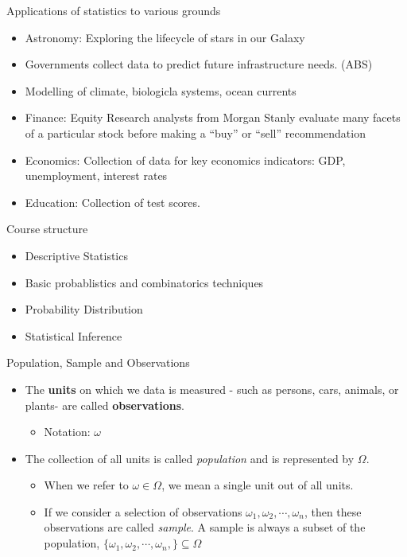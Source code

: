 \documentclass[ignorenonframetext,]{beamer}
\providecommand{\tightlist}{%
  \setlength{\itemsep}{0pt}\setlength{\parskip}{0pt}}
\begin{document}
\begin{frame}{Applications of statistics to various grounds}

\begin{itemize}
\item
  Astronomy: Exploring the lifecycle of stars in our Galaxy
\item
  Governments collect data to predict future infrastructure needs. (ABS)
\item
  Modelling of climate, biologicla systems, ocean currents
\item
  Finance: Equity Research analysts from Morgan Stanly evaluate many
  facets of a particular stock before making a ``buy'' or ``sell''
  recommendation
\item
  Economics: Collection of data for key economics indicators: GDP,
  unemployment, interest rates
\item
  Education: Collection of test scores.
\end{itemize}

\end{frame}

\begin{frame}{Course structure}

\begin{itemize}
\item
  Descriptive Statistics
\item
  Basic probablistics and combinatorics techniques
\item
  Probability Distribution
\item
  Statistical Inference
\end{itemize}

\end{frame}

\begin{frame}{Population, Sample and Observations}

\begin{itemize}
\item
  The \textbf{units} on which we data is measured - such as persons,
  cars, animals, or plants- are called \textbf{observations}.

  \begin{itemize}
  \tightlist
  \item
    Notation: \(\omega\)
  \end{itemize}
\item
  The collection of all units is called \emph{population} and is
  represented by \(\Omega\).

  \begin{itemize}
  \item
    When we refer to \(\omega\in\Omega\), we mean a single unit out of
    all units.
  \item
    If we consider a selection of observations
    \(\omega_1,\omega_2,\cdots, \omega_n\), then these observations are
    called \emph{sample}. A sample is always a subset of the population,
    \(\{\omega_1,\omega_2,\cdots,\omega_n,\}\subseteq\Omega\)
  \end{itemize}
\end{itemize}

\end{frame}
\end{document}
